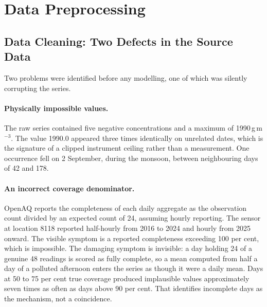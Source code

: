 \documentclass[12pt,a4paper]{report}
\begin{document}
\begin{table}[htbp]
\centering
\caption{The analysis dataset after cleaning.}
\label{tab:dataset}

\end{table}

\begin{table}[htbp]
\centering
\caption{Descriptive statistics of the cleaned series. The skewness and
kurtosis quantify what Section~\ref{sec:lit-ml} states qualitatively: a
distribution with a long right tail of extreme episodes rather than a
roughly symmetric one.}
\label{tab:descriptive}

\end{table}

\section{Data Preprocessing}
\label{sec:preprocess}

\subsection{Data Cleaning: Two Defects in the Source Data}
\label{sec:defects}

Two problems were identified before any modelling, one of which was silently
corrupting the series.

\paragraph{Physically impossible values.} The raw series contained five negative
concentrations and a maximum of 1990\,\textmu g\,m$^{-3}$. The value 1990.0
appeared three times identically on unrelated dates, which is the signature of a
clipped instrument ceiling rather than a measurement. One occurrence fell on 2
September, during the monsoon, between neighbouring days of 42 and 178.

\paragraph{An incorrect coverage denominator.} OpenAQ reports the completeness of
each daily aggregate as the observation count divided by an expected count of 24,
assuming hourly reporting. The sensor at location 8118 reported half-hourly from
2016 to 2024 and hourly from 2025 onward. The visible symptom is a reported
completeness exceeding 100 per cent, which is impossible. The damaging symptom is
invisible: a day holding 24 of a genuine 48 readings is scored as fully complete,
so a mean computed from half a day of a polluted afternoon enters the series as
though it were a daily mean. Days at 50 to 75 per cent true coverage produced
implausible values approximately seven times as often as days above 90 per cent.
That identifies incomplete days as the mechanism, not a coincidence.
\end{document}
